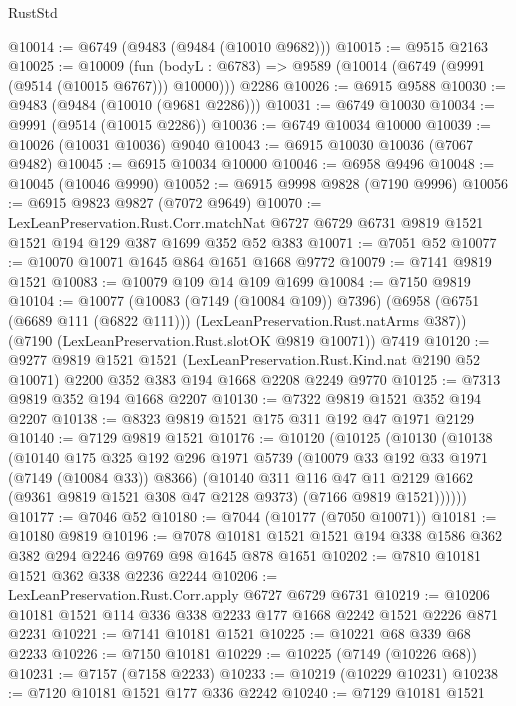\begin{lexlean}{RustStd}
\begin{coremodule}
@10014 := @6749 (@9483 (@9484 (@10010 @9682)))
@10015 := @9515 @2163
@10025 := @10009
    (fun (bodyL : @6783) => @9589 (@10014 (@6749 (@9991 (@9514 (@10015 @6767))) @10000)))
    @2286
@10026 := @6915 @9588
@10030 := @9483 (@9484 (@10010 (@9681 @2286)))
@10031 := @6749 @10030
@10034 := @9991 (@9514 (@10015 @2286))
@10036 := @6749 @10034 @10000
@10039 := @10026 (@10031 @10036) @9040
@10043 := @6915 @10030 @10036 (@7067 @9482)
@10045 := @6915 @10034 @10000
@10046 := @6958 @9496
@10048 := @10045 (@10046 @9990)
@10052 := @6915 @9998 @9828 (@7190 @9996)
@10056 := @6915 @9823 @9827 (@7072 @9649)
@10070 := LexLeanPreservation.Rust.Corr.matchNat
    @6727
    @6729
    @6731
    @9819
    @1521
    @1521
    @194
    @129
    @387
    @1699
    @352
    @52
    @383
@10071 := @7051 @52
@10077 := @10070 @10071 @1645 @864 @1651 @1668 @9772
@10079 := @7141 @9819 @1521
@10083 := @10079 @109 @14 @109 @1699
@10084 := @7150 @9819
@10104 := @10077
    (@10083 (@7149 (@10084 @109)) @7396)
    (@6958 (@6751 (@6689 @111 (@6822 @111))) (LexLeanPreservation.Rust.natArms @387))
    (@7190 (LexLeanPreservation.Rust.slotOK @9819 @10071))
    @7419
@10120 := @9277
    @9819
    @1521
    @1521
    (LexLeanPreservation.Rust.Kind.nat @2190 @52 @10071)
    @2200
    @352
    @383
    @194
    @1668
    @2208
    @2249
    @9770
@10125 := @7313 @9819 @352 @194 @1668 @2207
@10130 := @7322 @9819 @1521 @352 @194 @2207
@10138 := @8323 @9819 @1521 @175 @311 @192 @47 @1971 @2129
@10140 := @7129 @9819 @1521
@10176 := @10120
    (@10125
      (@10130
        (@10138
          (@10140
            @175
            @325
            @192
            @296
            @1971
            @5739
            (@10079 @33 @192 @33 @1971 (@7149 (@10084 @33)) @8366)
            (@10140
              @311
              @116
              @47
              @11
              @2129
              @1662
              (@9361 @9819 @1521 @308 @47 @2128 @9373)
              (@7166 @9819 @1521))))))
@10177 := @7046 @52
@10180 := @7044 (@10177 (@7050 @10071))
@10181 := @10180 @9819
@10196 := @7078 @10181 @1521 @1521 @194 @338 @1586 @362 @382 @294 @2246 @9769 @98 @1645 @878 @1651
@10202 := @7810 @10181 @1521 @362 @338 @2236 @2244
@10206 := LexLeanPreservation.Rust.Corr.apply @6727 @6729 @6731
@10219 := @10206 @10181 @1521 @114 @336 @338 @2233 @177 @1668 @2242 @1521 @2226 @871 @2231
@10221 := @7141 @10181 @1521
@10225 := @10221 @68 @339 @68 @2233
@10226 := @7150 @10181
@10229 := @10225 (@7149 (@10226 @68))
@10231 := @7157 (@7158 @2233)
@10233 := @10219 (@10229 @10231)
@10238 := @7120 @10181 @1521 @177 @336 @2242
@10240 := @7129 @10181 @1521

\end{coremodule}
\end{lexlean}
